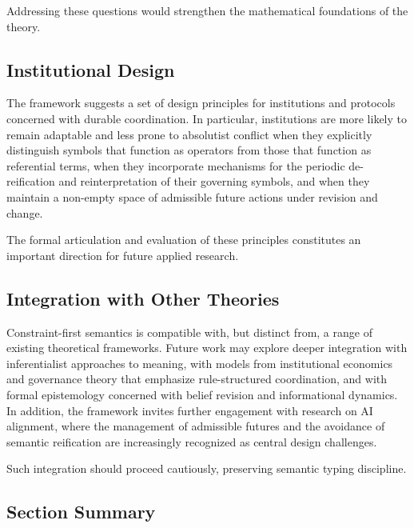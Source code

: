 \documentclass[11pt]{article}
\begin{document}
Addressing these questions would strengthen the mathematical foundations of the
theory.

\subsection{Institutional Design}

The framework suggests a set of design principles for institutions and protocols
concerned with durable coordination. In particular, institutions are more likely
to remain adaptable and less prone to absolutist conflict when they explicitly
distinguish symbols that function as operators from those that function as
referential terms, when they incorporate mechanisms for the periodic
de-reification and reinterpretation of their governing symbols, and when they
maintain a non-empty space of admissible future actions under revision and
change.

The formal articulation and evaluation of these principles constitutes an
important direction for future applied research.

\subsection{Integration with Other Theories}

Constraint-first semantics is compatible with, but distinct from, a range of
existing theoretical frameworks. Future work may explore deeper integration with
inferentialist approaches to meaning, with models from institutional economics
and governance theory that emphasize rule-structured coordination, and with
formal epistemology concerned with belief revision and informational dynamics.
In addition, the framework invites further engagement with research on AI
alignment, where the management of admissible futures and the avoidance of
semantic reification are increasingly recognized as central design challenges.


Such integration should proceed cautiously, preserving semantic typing
discipline.

\subsection{Section Summary}
\end{document}
